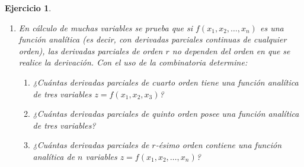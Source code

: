 \documentclass[12pt,twoside]{article}
\newtheorem{Ejer}{Ejercicio}
\begin{document}
\begin{Ejer}
\begin{enumerate}
\item En cálculo de muchas variables se prueba que si $f(x_1,x_2,\dots,x_n)$ es una función analítica (es decir, con derivadas parciales continuas de cualquier orden), las derivadas parciales de orden $r$ no dependen del orden en que se realice la derivación. Con el uso de la combinatoria determine:

\begin{enumerate}
\item ¿Cuántas derivadas parciales de cuarto orden tiene una función analítica de tres variables $z=f(x_1,x_2,x_3)$?
\item ¿Cuántas derivadas parciales de quinto orden posee una función analítica de tres variables?
\item ¿Cuántas derivadas parciales de $r$-ésimo orden contiene una función analítica de $n$ variables $z=f(x_1,x_2,\dots,x_n)$?
\end{enumerate}

\end{enumerate}
\end{Ejer}
\end{document}
